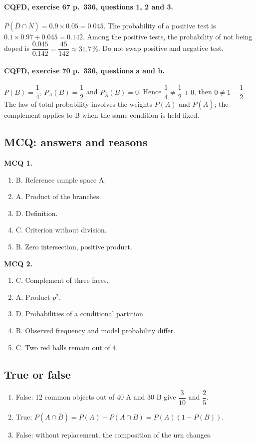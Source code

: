 \paragraph{CQFD, exercise 67 p.~336, questions 1, 2 and 3.} $P(\overline D\cap\overline N)=0.9\times0.05=0.045$. The probability of a positive test is $0.1\times0.97+0.045=0.142$. Among the positive tests, the probability of not being doped is $\dfrac{0.045}{0.142}=\dfrac{45}{142}\approx31.7\,\%$. Do not swap positive and negative test.
\paragraph{CQFD, exercise 70 p.~336, questions a and b.} $P(B)=\dfrac14$, $P_A(B)=\dfrac12$ and $P_{\overline A}(B)=0$. Hence $\dfrac14\ne\dfrac12+0$, then $0\ne1-\dfrac12$. The law of total probability involves the weights $P(A)$ and $P(\overline A)$; the complement applies to B when the same condition is held fixed.
\subsection*{MCQ: answers and reasons}
\textbf{MCQ 1.}
\begin{enumerate}
\item B. Reference sample space A.
\item A. Product of the branches.
\item D. Definition.
\item C. Criterion without division.
\item B. Zero intersection, positive product.
\end{enumerate}
\textbf{MCQ 2.}
\begin{enumerate}
\item C. Complement of three faces.
\item A. Product $p^2$.
\item D. Probabilities of a conditional partition.
\item B. Observed frequency and model probability differ.
\item C. Two red balls remain out of 4.
\end{enumerate}
\subsection*{True or false}
\begin{enumerate}
\item False: 12 common objects out of 40 A and 30 B give $\dfrac{3}{10}$ and $\dfrac{2}{5}$.
\item True: $P(A\cap\overline B)=P(A)-P(A\cap B)=P(A)(1-P(B))$.
\item False: without replacement, the composition of the urn changes.
\end{enumerate}
